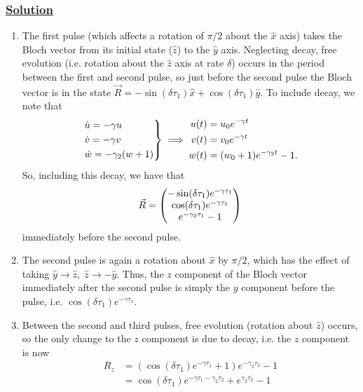 \documentclass[12pt]{article}
\begin{document}
\subsubsection*{\underline{Solution}}
\begin{enumerate}[label=(\alph*)]
    \item The first pulse (which affects a rotation of $\pi/2$ about the $\hat{x}$ axis) takes the Bloch vector from its initial state ($\hat{z}$) to the $\hat{y}$ axis.
    Neglecting decay, free evolution (i.e. rotation about the $\hat{z}$ axis at rate $\delta$) occurs in the period between the first and second pulse, so just before the second pulse the Bloch vector is in the state $\vec{R} = -\sin(\delta\tau_1)\hat{x} + \cos(\delta\tau_1)\hat{y}$.
    To include decay, we note that
    \[
    \begin{rcases*}
        \dot{u} = -\gamma u \\
        \dot{v} = -\gamma v \\
        \dot{w} = -\gamma_2(w + 1)
    \end{rcases*}
    \implies
    \begin{aligned}
        u(t) &= u_0e^{-\gamma t} \\
        v(t) &= v_0e^{-\gamma t} \\
        w(t) &= (w_0 + 1)e^{-\gamma_2 t} - 1.
    \end{aligned} 
    \]
    So, including this decay, we have that
    \[ \vec{R} = \mqty(-\sin(\delta\tau_1)e^{-\gamma\tau_1} \\ \cos(\delta\tau_1)e^{-\gamma \tau_1} \\ e^{-\gamma_2\tau_1} - 1) \]
    immediately before the second pulse.
    \item The second pulse is again a rotation about $\hat{x}$ by $\pi/2$, which has the effect of taking $\hat{y}\to\hat{z}, \; \hat{z}\to-\hat{y}$. 
    Thus, the $z$ component of the Bloch vector immediately after the second pulse is simply the $y$ component before the pulse, i.e. $\cos(\delta\tau_1)e^{-\gamma\tau_1}$.
    \item Between the second and third pulses, free evolution (rotation about $\hat{z}$) occurs, so the only change to the $z$ component is due to decay, i.e. the $z$ component is now
    \begin{align*}
        R_z &= (\cos(\delta\tau_1)e^{-\gamma\tau_1} + 1)e^{-\gamma_2\tau_2} - 1 \\
        &= \cos(\delta\tau_1)e^{-\gamma\tau_1 - \gamma_2\tau_2} + e^{\gamma_2\tau_2} - 1
    \end{align*}

\end{enumerate}
\end{document}
